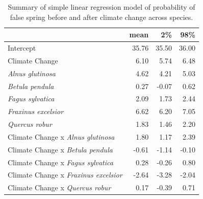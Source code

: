 \documentclass{article}\usepackage[]{graphicx}\usepackage[]{color}
\begin{document}
\begin{table}[H]
\centering
\caption{Summary of simple linear regression model of probability of false spring before and after climate change across species.} 
\begin{tabular}{lrrr}
  \hline
 & mean & 2\% & 98\% \\ 
  \hline
Intercept & 35.76 & 35.50 & 36.00 \\ 
  Climate Change & 6.10 & 5.74 & 6.48 \\ 
  \textit{Alnus glutinosa} & 4.62 & 4.21 & 5.03 \\ 
  \textit{Betula pendula} & 0.27 & -0.07 & 0.62 \\ 
  \textit{Fagus sylvatica} & 2.09 & 1.73 & 2.44 \\ 
  \textit{Fraxinus excelsior} & 6.62 & 6.20 & 7.05 \\ 
  \textit{Quercus robur} & 1.83 & 1.46 & 2.20 \\ 
  Climate Change x \textit{Alnus glutinosa} & 1.80 & 1.17 & 2.39 \\ 
  Climate Change x \textit{Betula pendula} & -0.61 & -1.14 & -0.10 \\ 
  Climate Change x \textit{Fagus sylvatica} & 0.28 & -0.26 & 0.80 \\ 
  Climate Change x \textit{Fraxinus excelsior} & -2.64 & -3.28 & -2.04 \\ 
  Climate Change x \textit{Quercus robur} & 0.17 & -0.39 & 0.71 \\ 
   \hline
\end{tabular}
\end{table}
\end{document}
